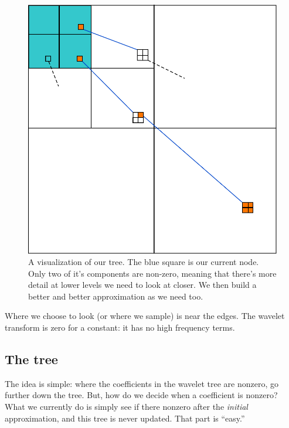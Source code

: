 \documentclass[leqno]{article}
\begin{document}
            \begin{figure}[h]
                \includegraphics[angle=0]{better_diagram}
                \caption{A visualization of our tree. The blue square is our current node. Only two of it's components are non-zero, meaning that there's more detail at lower levels we need to look at closer. We then build a better and better approximation as we need too.}
                \label{fig:tree}
            \end{figure}
            
            Where we choose to look (or where we sample) is near the edges. The wavelet transform is zero for a constant: it has no high frequency terms.





            \subsection{The tree}
                The idea is simple: where the coefficients in the wavelet tree are nonzero, go further down the tree. But, how do we decide when a coefficient is nonzero? What we currently do is simply see if there nonzero after the \textit{initial} approximation, and this tree is never updated. That part is ``easy.''
\end{document}
